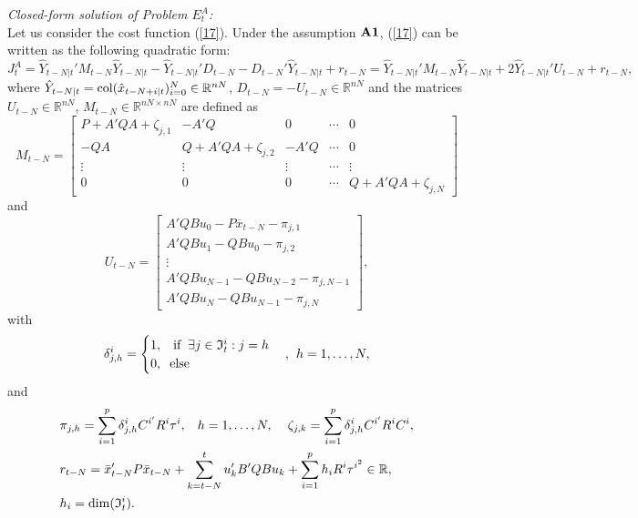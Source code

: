 \documentclass[11pt,journal,onecolumn]{IEEEtran}
\begin{document}
{\em Closed-form solution of Problem $E_{t}^{A}$:}\\
Let us consider the cost function (\ref{17}). Under the assumption $\bf {A}1$, (\ref{17}) can be written as the following quadratic form:
\begin{equation}\label{A1}
J_{t}^{A} = \hat{Y}_{t-N|t}'M_{t-N}\hat{Y}_{t-N|t}-\hat{Y}_{t-N|t}'D_{t-N}-D_{t-N}'\hat{Y}_{t-N|t}+r_{t-N}= \hat{Y}_{t-N|t}'M_{t-N}\hat{Y}_{t-N|t}+2\hat{Y}_{t-N|t}'U_{t-N}+r_{t-N},
\end{equation}
where $\hat{Y}_{t-N|t}={\rm col}(\hat{x}_{t-N+i|t})_{i=0}^{N}\in\mathbb{R}^{nN}$, $D_{t-N}=-U_{t-N}\in\mathbb{R}^{nN}$ and the matrices $U_{t-N}\in\mathbb{R}^{nN}$, $M_{t-N}\in\mathbb{R}^{nN\times nN}$ are defined as
\begin{equation*}
M_{t-N}=\begin{bmatrix} P+A'QA+\zeta_{j,1} & -A'Q & 0 & \cdots & 0 \\ -QA & Q+A'QA+\zeta_{j,2} & -A'Q & \cdots & 0 \\ \vdots & \vdots & \vdots & \cdots & \vdots \\ 0 & 0 & 0 & \cdots & Q+A'QA+\zeta_{j,N} \end{bmatrix}
\end{equation*}
and
\begin{equation*}
U_{t-N}=\begin{bmatrix} A'QBu_{0}-P\overline{x}_{t-N}-\pi_{j,1} \\ A'Q Bu_{1}-QBu_{0}-\pi_{j,2} \\ \vdots \\ A'Q Bu_{N-1}-QBu_{N-2}-\pi_{j,N-1} \\ A'Q Bu_{N}-QBu_{N-1}-\pi_{j,N}\end{bmatrix},
\end{equation*}
with
\begin{equation*}
\delta_{j,h}^{i}=\begin{cases} 1,\hspace{3mm}\text{if}\hspace{2mm}\exists j\in\mathfrak{I}^{i}_t:j=h \\ 0,\hspace{2mm}\text{else} \end{cases},\hspace{1.5mm}h=1,\ldots,N,
\end{equation*}
and
\begin{equation*}
\begin{split}
&\pi_{j,h}=\sum_{i=1}^{p}\delta_{j,h}^{i}C^{i'}R^{i}\tau^{i},\hspace{3mm}h=1,\ldots,N,\hspace{4mm}
\displaystyle{\zeta_{j,k}=\sum_{i=1}^{p}\delta_{j,h}^{i}C^{i'}R^{i}C^{i}}, \\
&r_{t-N} =\bar{x}_{t-N}'P\bar{x}_{t-N}+\sum_{k=t-N}^{t}u_{k}'B'QBu_{k}+\sum_{i=1}^{p}h_{i}R^{i}\tau^{i^{2}}\in\mathbb{R}, \\
&h_{i} =\dim(\mathfrak{I}^{i}_t).
\end{split}
\end{equation*}
\end{document}
